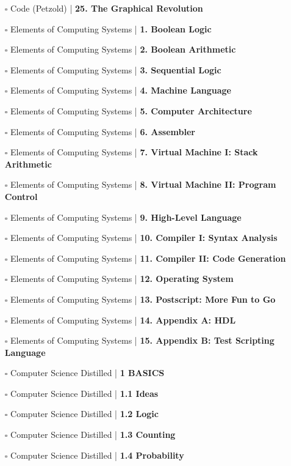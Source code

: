 \documentclass[a4, landscape, 12pt]{article}
\newcommand{\checkbox}{$\square$}%
\begin{document}
\begin{itemize}
{}
\item [\checkbox]  Code (Petzold) | \textbf{ 25. The Graphical Revolution
}
\item [\checkbox]  Elements of Computing Systems  | \textbf{ 1. Boolean Logic
}
\item [\checkbox]  Elements of Computing Systems  | \textbf{ 2. Boolean Arithmetic
}
\item [\checkbox]  Elements of Computing Systems  | \textbf{ 3. Sequential Logic
}
\item [\checkbox]  Elements of Computing Systems  | \textbf{ 4. Machine Language
}
\item [\checkbox]  Elements of Computing Systems  | \textbf{ 5. Computer Architecture
}
\item [\checkbox]  Elements of Computing Systems  | \textbf{ 6. Assembler
}
\item [\checkbox]  Elements of Computing Systems  | \textbf{ 7. Virtual Machine I: Stack Arithmetic
}
\item [\checkbox]  Elements of Computing Systems  | \textbf{ 8. Virtual Machine II: Program Control
}
\item [\checkbox]  Elements of Computing Systems  | \textbf{ 9. High-Level Language
}
\item [\checkbox]  Elements of Computing Systems  | \textbf{ 10. Compiler I: Syntax Analysis
}
\item [\checkbox]  Elements of Computing Systems  | \textbf{ 11. Compiler II: Code Generation
}
\item [\checkbox]  Elements of Computing Systems  | \textbf{ 12. Operating System
}
\item [\checkbox]  Elements of Computing Systems  | \textbf{ 13. Postscript: More Fun to Go
}
\item [\checkbox]  Elements of Computing Systems  | \textbf{ 14. Appendix A: HDL
}
\item [\checkbox]  Elements of Computing Systems  | \textbf{ 15. Appendix B: Test Scripting Language
}
\item [\checkbox]  Computer Science Distilled | \textbf{ 1 BASICS
}
\item [\checkbox]  Computer Science Distilled | \textbf{ 1.1 Ideas
}
\item [\checkbox]  Computer Science Distilled | \textbf{ 1.2 Logic
}
\item [\checkbox]  Computer Science Distilled | \textbf{ 1.3 Counting
}
\item [\checkbox]  Computer Science Distilled | \textbf{ 1.4 Probability
}
\end{itemize}
\end{document}
